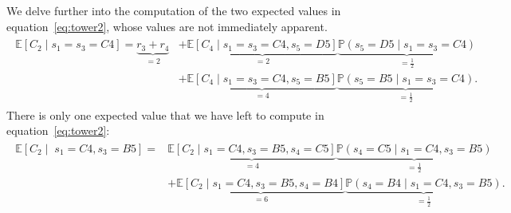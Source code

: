 We delve further into the computation of the two expected values in
equation~\eqref{eq:tower2}, whose values are not immediately apparent.
%
\begin{align*}
    \begin{split}
    \mathbb{E}[C_2 \mid s_1=s_3=C4] = \underbrace{r_3+r_4}_{=2}
    &+ \underbrace{\mathbb{E}[C_4 \mid s_1=s_3=C4, s_5=D5]}_{=2} \underbrace{\mathbb{P}(s_5=D5 \mid s_1=s_3=C4)}_{=\frac{1}{2}} \\
    &+ \underbrace{\mathbb{E}[C_4 \mid s_1=s_3=C4, s_5=B5]}_{=4} \underbrace{\mathbb{P}(s_5=B5 \mid s_1=s_3=C4)}_{=\frac{1}{2}}.
    \end{split}
\end{align*}
%
%
There is only one expected value that we have left to compute in
equation~\eqref{eq:tower2}:
%
\begin{align*}
    \begin{split}
    \mathbb{E}[C_2 \mid \; s_1=C4, s_3=B5] =
    &\underbrace{\mathbb{E}[C_2 \mid s_1=C4, s_3=B5, s_4=C5]}_{=4} \underbrace{\mathbb{P}(s_4=C5 \mid s_1=C4, s_3=B5)}_{=\frac{1}{2}} \\
    &+ \underbrace{\mathbb{E}[C_2 \mid s_1=C4, s_3=B5, s_4=B4]}_{=6} \underbrace{\mathbb{P}(s_4=B4 \mid s_1=C4, s_3=B5)}_{=\frac{1}{2}}.
    \end{split}
\end{align*}
